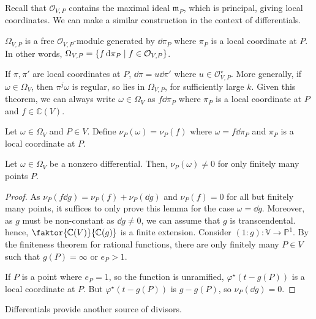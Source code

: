 Recall that \( \mathcal O_{V,P} \) contains the maximal ideal \( \mathfrak m_P \), which is principal, giving local coordinates.
We can make a similar construction in the context of differentials.
\begin{theorem}
    \( \Omega_{V,P} \) is a free \( \mathcal O_{V,P} \)-module generated by \( \dd{\pi_P} \) where \( \pi_P \) is a local coordinate at \( P \).
    In other words, \( \Omega_{V,P} = \qty{f\dd{\pi_P} \mid f \in \mathcal O_{V,P}} \).
\end{theorem}
\begin{remark}
    If \( \pi, \pi' \) are local coordinates at \( P \), \( \dd{\pi} = u \dd{\pi'} \) where \( u \in \mathcal O_{V,P}^\star \).
    More generally, if \( \omega \in \Omega_V \), then \( \pi^j \omega \) is regular, so lies in \( \Omega_{V,P} \), for sufficiently large \( k \).
    Given this theorem, we can always write \( \omega \in \Omega_V \) as \( f \dd{\pi_P} \) where \( \pi_P \) is a local coordinate at \( P \) and \( f \in \mathbb C(V) \).
\end{remark}
\begin{definition}
    Let \( \omega \in \Omega_V \) and \( P \in V \).
    Define \( \nu_P(\omega) = \nu_P(f) \) where \( \omega = f \dd{\pi_P} \) and \( \pi_P \) is a local coordinate at \( P \).
\end{definition}
\begin{lemma}
    Let \( \omega \in \Omega_V \) be a nonzero differential.
    Then, \( \nu_P(\omega) \neq 0 \) for only finitely many points \( P \).
\end{lemma}
\begin{proof}
    As \( \nu_P(f \dd{g}) = \nu_P(f) + \nu_P(\dd{g}) \) and \( \nu_P(f) = 0 \) for all but finitely many points, it suffices to only prove this lemma for the case \( \omega = \dd{g} \).
    Moreover, as \( g \) must be non-constant as \( \dd{g} \neq 0 \), we can assume that \( g \) is transcendental.
    hence, \( \faktor{\mathbb C(V)}{\mathbb C(g)} \) is a finite extension.
    Consider \( (1 : g) \colon \mathbb V \to \mathbb P^1 \).
    By the finiteness theorem for rational functions, there are only finitely many \( P \in V \) such that \( g(P) = \infty \) or \( e_P > 1 \).

    If \( P \) is a point where \( e_P = 1 \), so the function is unramified, \( \varphi^\star (t - g(P)) \) is a local coordinate at \( P \).
    But \( \varphi^\star(t-g(P)) \) is \( g - g(P) \), so \( \nu_P(\dd{g}) = 0 \).
\end{proof}
Differentials provide another source of divisors.
